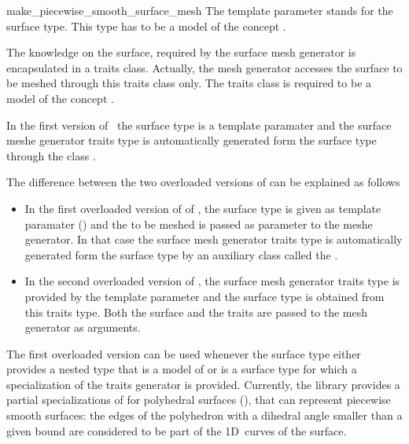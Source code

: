 \begin{ccRefFunction}{make_piecewise_smooth_surface_mesh}
The template parameter   stands for the surface type.
This type has to be a model of the concept .

The knowledge on the surface, required by the surface mesh generator
is  encapsulated in a
traits class. Actually, the mesh generator accesses the surface to be meshed
through this traits class only. 
The traits class is required to be a model
of the concept .

In the first  version
of  \ccRefName\, the surface type is a template paramater 
and the surface meshe generator traits type 
is  automatically generated form the surface type  through
the class 
.

The difference between the two overloaded versions of
can be explained as follows
\begin{itemize}
\item
In the first  overloaded version of
of ,  the surface type  is given  
as template paramater  () and the 
to be meshed is passed as parameter to the meshe generator.
In that case the surface mesh generator traits type 
is  automatically generated form the surface type
by an auxiliary class called  the .
\item In the second overloaded version of , 
the surface mesh generator traits type is provided
by the  template parameter 
and the surface type is obtained from this traits type.
Both the surface and the traits 
are passed to the mesh generator as arguments. 
\end{itemize}


The first overloaded version can be used
whenever the surface type either provides  a nested type
that is  a model of 
or is a surface type for which a specialization
of the traits generator 
is provided.
Currently, the library provides a partial specializations of
 for polyhedral surfaces
(), that can represent piecewise
smooth surfaces: the edges of the polyhedron with a dihedral angle smaller
than a given bound are considered to be part of the 1D~curves of the
surface.




\end{ccRefFunction}
